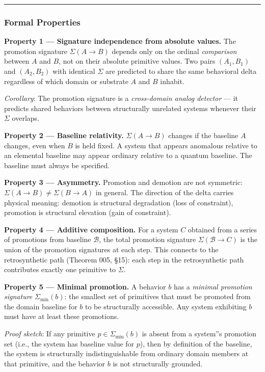 \documentclass[12pt,a4paper]{article}
\newcommand{\pilcrow}{\S}
\begin{document}
\begin{center}
\rule{0.5\textwidth}{0.4pt}
\end{center}

\subsubsection{Formal Properties}

\textbf{Property 1 --- Signature independence from absolute values.}
The promotion signature $\Sigma(A \to B)$ depends only on the ordinal \emph{comparison} between $A$ and $B$, not on their absolute primitive values. Two pairs $(A_1, B_1)$ and $(A_2, B_2)$ with identical $\Sigma$ are predicted to share the same behavioral delta regardless of which domain or substrate $A$ and $B$ inhabit.

\emph{Corollary}: The promotion signature is a \emph{cross-domain analog detector} --- it predicts shared behaviors between structurally unrelated systems whenever their $\Sigma$ overlaps.

\textbf{Property 2 --- Baseline relativity.}
$\Sigma(A \to B)$ changes if the baseline $A$ changes, even when $B$ is held fixed. A system that appears anomalous relative to an elemental baseline may appear ordinary relative to a quantum baseline. The baseline must always be specified.

\textbf{Property 3 --- Asymmetry.}
Promotion and demotion are not symmetric: $\Sigma(A \to B) \neq \Sigma(B \to A)$ in general. The direction of the delta carries physical meaning: demotion is structural degradation (loss of constraint), promotion is structural elevation (gain of constraint).

\textbf{Property 4 --- Additive composition.}
For a system $C$ obtained from a series of promotions from baseline $\mathcal{B}$, the total promotion signature $\Sigma(\mathcal{B} \to C)$ is the union of the promotion signatures at each step. This connects to the retrosynthetic path (Theorem 005, \pilcrow{}15): each step in the retrosynthetic path contributes exactly one primitive to $\Sigma$.

\textbf{Property 5 --- Minimal promotion.}
A behavior $b$ has a \emph{minimal promotion signature} $\Sigma_\text{min}(b)$: the smallest set of primitives that must be promoted from the domain baseline for $b$ to be structurally accessible. Any system exhibiting $b$ must have at least these promotions.

\emph{Proof sketch}: If any primitive $p \in \Sigma_\text{min}(b)$ is absent from a system''s promotion set (i.e., the system has baseline value for $p$), then by definition of the baseline, the system is structurally indistinguishable from ordinary domain members at that primitive, and the behavior $b$ is not structurally grounded.
\end{document}
